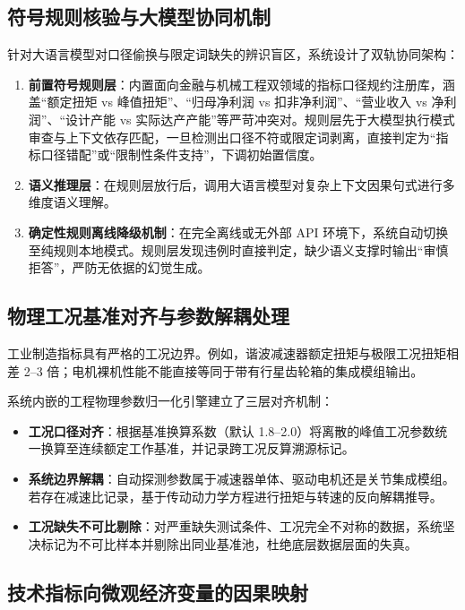 \documentclass[11pt,a4paper]{ctexart}
\begin{document}
\subsection{符号规则核验与大模型协同机制}

针对大语言模型对口径偷换与限定词缺失的辨识盲区，系统设计了双轨协同架构：
\begin{enumerate}
  \item \textbf{前置符号规则层}：内置面向金融与机械工程双领域的指标口径规约注册库，涵盖“额定扭矩 vs 峰值扭矩”、“归母净利润 vs 扣非净利润”、“营业收入 vs 净利润”、“设计产能 vs 实际达产产能”等严苛冲突对。规则层先于大模型执行模式审查与上下文依存匹配，一旦检测出口径不符或限定词剥离，直接判定为“指标口径错配”或“限制性条件支持”，下调初始置信度。
  \item \textbf{语义推理层}：在规则层放行后，调用大语言模型对复杂上下文因果句式进行多维度语义理解。
  \item \textbf{确定性规则离线降级机制}：在完全离线或无外部 API 环境下，系统自动切换至纯规则本地模式。规则层发现违例时直接判定，缺少语义支撑时输出“审慎拒答”，严防无依据的幻觉生成。
\end{enumerate}

\subsection{物理工况基准对齐与参数解耦处理}

工业制造指标具有严格的工况边界。例如，谐波减速器额定扭矩与极限工况扭矩相差 2--3 倍；电机裸机性能不能直接等同于带有行星齿轮箱的集成模组输出。

系统内嵌的工程物理参数归一化引擎建立了三层对齐机制：
\begin{itemize}
  \item \textbf{工况口径对齐}：根据基准换算系数（默认 1.8--2.0）将离散的峰值工况参数统一换算至连续额定工作基准，并记录跨工况反算溯源标记。
  \item \textbf{系统边界解耦}：自动探测参数属于减速器单体、驱动电机还是关节集成模组。若存在减速比记录，基于传动动力学方程进行扭矩与转速的反向解耦推导。
  \item \textbf{工况缺失不可比剔除}：对严重缺失测试条件、工况完全不对称的数据，系统坚决标记为不可比样本并剔除出同业基准池，杜绝底层数据层面的失真。
\end{itemize}

\subsection{技术指标向微观经济变量的因果映射}
\end{document}
